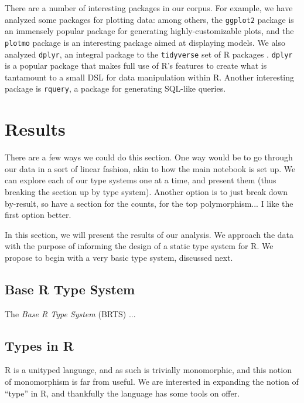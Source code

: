 \documentclass[acmsmall,10pt,review,anonymous]{acmart}\settopmatter{printfolios=true,printccs=false,printacmref=false}
\begin{document}
There are a number of interesting packages in our corpus.
For example, we have analyzed some packages for plotting data: among others, the {\tt ggplot2} package is an immensely popular package for generating highly-customizable plots, and the {\tt plotmo} package is an interesting package aimed at displaying models.
We also analyzed {\tt dplyr}, an integral package to the {\tt tidyverse} set of R packages .
{\tt dplyr} is a popular package that makes full use of R's features to create what is tantamount to a small DSL for data manipulation within R.
Another interesting package is {\tt rquery}, a package for generating SQL-like queries. 


%
%
%
%
%
%
\section{Results}

 There are a few ways we could do this section.
One way would be to go through our data in a sort of linear fashion, akin to how the main notebook is set up.
We can explore each of our type systems one at a time, and present them (thus breaking the section up by type system).
Another option is to just break down by-result, so have a section for the counts, for the top polymorphism...
I like the first option better.

In this section, we will present the results of our analysis. 
We approach the data with the purpose of informing the design of a static type system for R.
We propose to begin with a very basic type system, discussed next.

\subsection{Base R Type System}

The {\it Base R Type System} (BRTS) ...

%
%
%
%
\subsection{Types in R}


R is a unityped language, and as such is trivially monomorphic, and this notion of monomorphism is far from useful.
We are interested in expanding the notion of ``type'' in R, and thankfully the language has some tools on offer.
\end{document}
